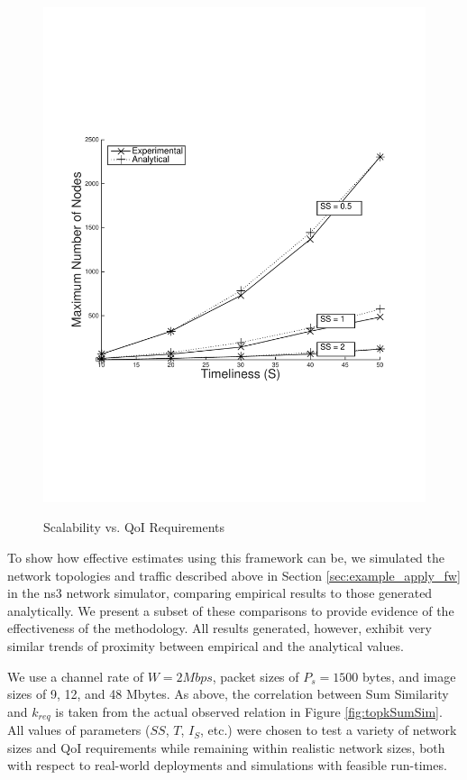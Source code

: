 \begin{figure}
{        \includegraphics[scale=0.4, clip=true, trim=15mm 65mm 20mm 65mm]{figures/scal_sim_results/grid_uni_2d_mhop_2.pdf}
        \label{fig:scal_vs_qoi_grid}
        }
   \caption{Scalability vs. QoI Requirements}
   \label{fig:scal_vs_qoi}
\end{figure}

To show how effective estimates using this framework can be, we simulated the network topologies and traffic described above in Section \ref{sec:example_apply_fw} in the ns3 network simulator, comparing empirical results to those generated analytically.  We present a subset of these comparisons to provide evidence of the effectiveness of the methodology.  All results generated, however, exhibit very similar trends of proximity between empirical and the analytical values.

We use a channel rate of $W= 2 Mbps$, packet sizes of $P_s = 1500$ bytes, and image sizes of 9, 12, and 48 Mbytes.  As above, the correlation between Sum Similarity and $k_{req}$ is taken from the actual observed relation in Figure \ref{fig:topkSumSim}.  All values of parameters ($SS$, $T$, $I_S$, etc.) were chosen to test a variety of network sizes and QoI requirements while remaining within realistic network sizes, both with respect to real-world deployments and simulations with feasible run-times.%


